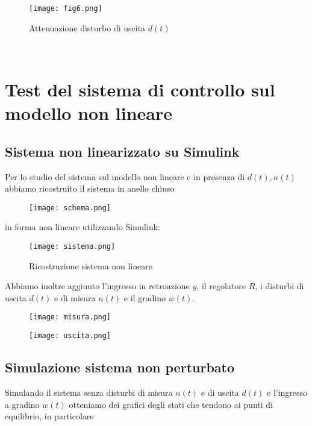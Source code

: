 \documentclass{article}
\begin{document}
\begin{figure}[!h]
\centering
\texttt{[image: fig6.png]}
\caption{\label{fig:orbit}Attenuazione disturbo di uscita $d(t)$}
\end{figure}\\
\pagebreak


\section{Test del sistema di controllo sul modello non lineare}

\subsection{Sistema non linearizzato su Simulink}
Per lo studio del sistema sul modello non lineare e in presenza di $d(t),n(t)$ abbiamo ricostruito il sistema in anello chiuso
\\
\begin{figure}[!h]
\centering
\texttt{[image: schema.png]}
\end{figure}

in forma non lineare utilizzando Simulink:

\begin{figure}[!h]
\centering
\texttt{[image: sistema.png]}
\caption{\label{fig:orbit}Ricostruzione sistema non lineare}
\end{figure}
\pagebreak

Abbiamo inoltre aggiunto l'ingresso in retroazione $y$, il regolatore $R$, i disturbi di uscita
$d(t)$ e di misura $n(t)$ e il gradino $w(t)$.
\begin{figure}[!h]
   \begin{minipage}{0.60\textwidth}
     \centering
     \texttt{[image: misura.png]}
   \end{minipage}\hfill
   \begin{minipage}{0.45\textwidth}
     \centering
     \texttt{[image: uscita.png]}
   \end{minipage}
\end{figure}

\subsection{Simulazione sistema non perturbato}

Simulando il sistema senza disturbi di misura $n(t)$ e di uscita $d(t)$ e l'ingresso a gradino $w(t)$ otteniamo dei grafici degli stati che tendono ai punti di equilibrio, in particolare
\\
\end{document}
